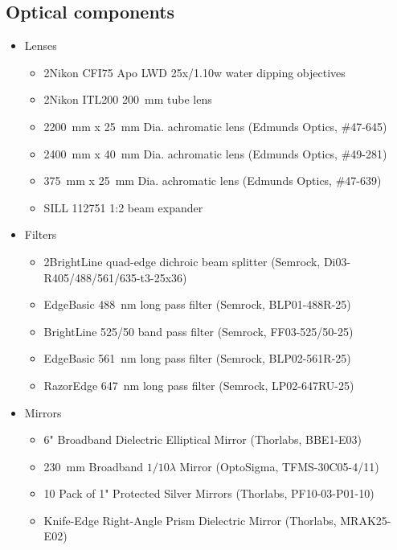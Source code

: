 \begin{singlespace}
\subsection*{Optical components}
  \begin{itemize}
    \item Lenses
    \begin{itemize}
      \item 2\texttimes Nikon CFI75 Apo LWD 25x/1.10w water dipping objectives
      \item 2\texttimes Nikon ITL200 \SI{200}{mm} tube lens
      \item 2\texttimes \SI{200}{mm} x \SI{25}{mm} Dia. achromatic lens (Edmunds Optics, \#47-645)
      \item 2\texttimes \SI{400}{mm} x \SI{40}{mm} Dia. achromatic lens (Edmunds Optics, \#49-281)
      \item 3\texttimes \SI{75}{mm} x \SI{25}{mm} Dia. achromatic lens (Edmunds Optics, \#47-639)
      \item SILL 112751 1:2 beam expander
    \end{itemize}
    \item Filters
    \begin{itemize}
      \item 2\texttimes BrightLine quad-edge dichroic beam splitter (Semrock, Di03-R405/488/561/635-t3-25x36)
      \item EdgeBasic \SI{488}{nm} long pass filter (Semrock, BLP01-488R-25)
      \item BrightLine 525/50 band pass filter (Semrock, FF03-525/50-25)
      \item EdgeBasic \SI{561}{nm} long pass filter (Semrock, BLP02-561R-25)
      \item RazorEdge \SI{647}{nm} long pass filter (Semrock, LP02-647RU-25)
    \end{itemize}
    \item Mirrors
    \begin{itemize}
      \item 6" Broadband Dielectric Elliptical Mirror (Thorlabs, BBE1-E03)
      \item 2\texttimes \SI{30}{mm} Broadband $1/10 \lambda$ Mirror (OptoSigma, TFMS-30C05-4/11)
      \item 10 Pack of 1" Protected Silver Mirrors (Thorlabs, PF10-03-P01-10)
      \item Knife-Edge Right-Angle Prism Dielectric Mirror (Thorlabs, MRAK25-E02)
    \end{itemize}
  \end{itemize}


\end{singlespace}
